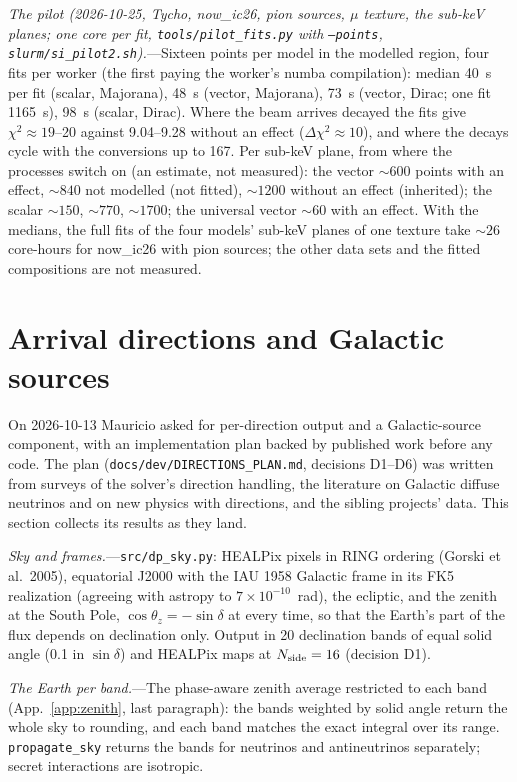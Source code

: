 \documentclass[11pt,a4paper]{article}
\newcommand{\file}[1]{\nolinkurl{#1}}
\begin{document}
\textit{The pilot (2026-10-25, Tycho, now\_ic26, pion sources, $\mu$ texture, the sub-keV planes; one core per
fit, \file{tools/pilot\_fits.py} with \texttt{--points}, \file{slurm/si\_pilot2.sh}).}---Sixteen points per model in
the modelled region, four fits per worker (the first paying the worker's numba compilation): median 40~s per fit
(scalar, Majorana), 48~s (vector, Majorana), 73~s (vector, Dirac; one fit 1165~s), 98~s (scalar, Dirac). Where the beam
arrives decayed the fits give $\chi^2 \approx 19$--20 against 9.04--9.28 without an effect ($\Delta\chi^2\approx10$), and
where the decays cycle with the conversions up to 167. Per sub-keV plane, from where the processes switch on (an
estimate, not measured): the vector $\sim600$ points with an effect, $\sim840$ not modelled (not fitted), $\sim1200$
without an effect (inherited); the scalar $\sim150$, $\sim770$, $\sim1700$; the universal vector $\sim60$ with an
effect. With the medians, the full fits of the four models' sub-keV planes of one texture take $\sim26$ core-hours for
now\_ic26 with pion sources; the other data sets and the fitted compositions are not measured.


\section{Arrival directions and Galactic sources}
\label{sec:directions}

On 2026-10-13 Mauricio asked for per-direction output and a Galactic-source component, with an
implementation plan backed by published work before any code. The plan
(\file{docs/dev/DIRECTIONS_PLAN.md}, decisions D1--D6) was written from surveys of the solver's
direction handling, the literature on Galactic diffuse neutrinos and on new physics with directions,
and the sibling projects' data. This section collects its results as they land.

\textit{Sky and frames.}---\file{src/dp_sky.py}: HEALPix pixels in RING ordering (Gorski et al.\
2005), equatorial J2000 with the IAU 1958 Galactic frame in its FK5 realization (agreeing with astropy
to $7\times10^{-10}$~rad), the ecliptic, and the zenith at the South Pole, $\cos\theta_z = -\sin\delta$
at every time, so that the Earth's part of the flux depends on declination only. Output in 20
declination bands of equal solid angle (0.1 in $\sin\delta$) and HEALPix maps at $N_{\rm side} = 16$
(decision D1).

\textit{The Earth per band.}---The phase-aware zenith average restricted to each band
(App.~\ref{app:zenith}, last paragraph): the bands weighted by solid angle return the whole sky to
rounding, and each band matches the exact integral over its range. \file{propagate_sky} returns the
bands for neutrinos and antineutrinos separately; secret interactions are isotropic.
\end{document}
